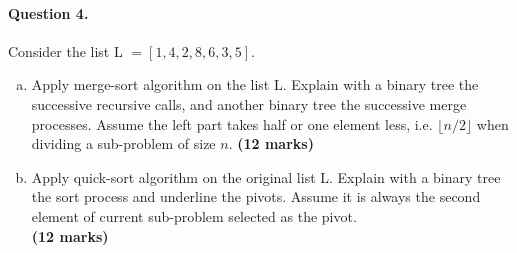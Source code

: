 \documentclass[12pt]{article}
\begin{document}
\paragraph{Question 4.} Consider the list L $=[1,4,2,8,6,3,5]$.
\begin{enumerate}[(a)]
\item Apply merge-sort algorithm on the list L. Explain with a binary tree the successive recursive calls, and another binary tree the successive merge processes. Assume the left part takes half or one element less, i.e. $\lfloor n/2\rfloor$ when dividing a sub-problem of size $n$. \hfill {\bf (12 marks)}
\item Apply quick-sort algorithm on the original list L. Explain with a binary tree the sort process and underline the pivots. Assume it is always the second element of current sub-problem selected as the pivot.\\\mbox{}\hfill {\bf (12 marks)}
\end{enumerate}
\end{document}
